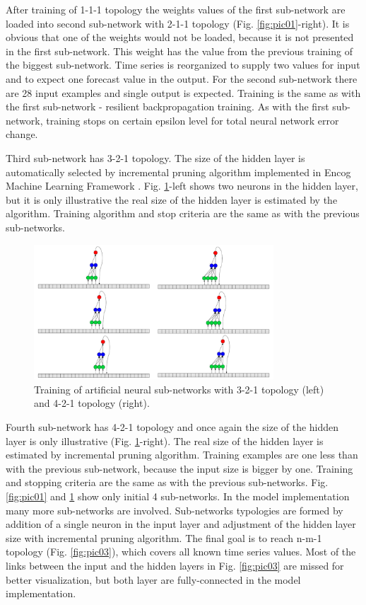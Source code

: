 \documentclass[11pt]{article}
\begin{document}
After training of 1-1-1 topology the weights values of the first sub-network are loaded into second sub-network with 2-1-1 topology (Fig. \ref{fig:pic01}-right). It is obvious that one of the weights would not be loaded, because it is not presented in the first sub-network. This weight has the value from the previous training of the biggest sub-network. Time series is reorganized to supply two values for input and to expect one forecast value in the output. For the second sub-network there are 28 input examples and single output is expected. Training is the same as with the first sub-network - resilient backpropagation training. As with the first sub-network, training stops on certain epsilon level for total neural network error change.

Third sub-network has 3-2-1 topology. The size of the hidden layer is automatically selected by incremental pruning algorithm implemented in Encog Machine Learning Framework \cite{heaton01}. Fig. \ref{fig:pic02}-left shows two neurons in the hidden layer, but it is only illustrative the real size of the hidden layer is estimated by the algorithm. Training algorithm and stop criteria are the same as with the previous sub-networks. 

\begin{figure}[ht!]
   \centering
     \includegraphics[width=0.8\textwidth]{pic02}
    \caption {Training of artificial neural sub-networks with 3-2-1 topology (left) and 4-2-1 topology (right).}
\label{fig:pic02}
\end{figure}
\FloatBarrier

Fourth sub-network has 4-2-1 topology and once again the size of the hidden layer is only illustrative (Fig. \ref{fig:pic02}-right). The real size of the hidden layer is estimated by incremental pruning algorithm. Training examples are one less than with the previous sub-network, because the input size is bigger by one. Training and stopping criteria are the same as with the previous sub-networks. Fig. \ref{fig:pic01} and \ref{fig:pic02} show only initial 4 sub-networks. In the model implementation many more sub-networks are involved. Sub-networks typologies are formed by addition of a single neuron in the input layer and adjustment of the hidden layer size with incremental pruning algorithm. The final goal is to reach n-m-1 topology (Fig. \ref{fig:pic03}), which covers all known time series values. Most of the links between the input and the hidden layers in Fig. \ref{fig:pic03} are missed for better visualization, but both layer are fully-connected in the model implementation. 
\end{document}
